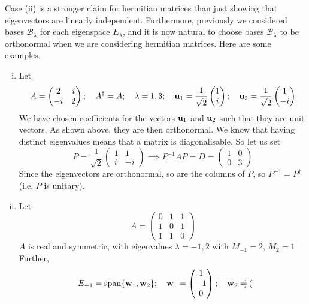 \documentclass{article}
\begin{document}
Case (ii) is a stronger claim for hermitian matrices than just showing that eigenvectors are linearly independent. Furthermore, previously we considered bases $\mathcal B_\lambda$ for each eigenspace $E_\lambda$, and it is now natural to choose bases $\mathcal B_\lambda$ to be orthonormal when we are considering hermitian matrices. Here are some examples.
\begin{enumerate}[(i)]
	\item Let
	      \[ A = \begin{pmatrix}
			      2 & i \\ -i & 2
		      \end{pmatrix};\quad A^\dagger = A;\quad \lambda = 1, 3;\quad\vb u_1 = \frac{1}{\sqrt{2}} \begin{pmatrix}
			      1 \\i
		      \end{pmatrix};\quad\vb u_2 = \frac{1}{\sqrt{2}} \begin{pmatrix}
			      1 \\-i
		      \end{pmatrix} \]
	      We have chosen coefficients for the vectors $\vb u_1$ and $\vb u_2$ such that they are unit vectors. As shown above, they are then orthonormal. We know that having distinct eigenvalues means that a matrix is diagonalisable. So let us set
	      \[ P =  \frac{1}{\sqrt{2}} \begin{pmatrix}
			      1 & 1 \\ i & -i
		      \end{pmatrix} \implies P^{-1}AP = D = \begin{pmatrix}
			      1 & 0 \\ 0 & 3
		      \end{pmatrix} \]
	      Since the eigenvectors are orthonormal, so are the columns of $P$, so $P^{-1} = P^\dagger$ (i.e. $P$ is unitary).
	\item Let
	      \[ A = \begin{pmatrix}
			      0 & 1 & 1 \\ 1 & 0 & 1 \\ 1 & 1 & 0
		      \end{pmatrix} \]
	      $A$ is real and symmetric, with eigenvalues $\lambda = -1, 2$ with $M_{-1} = 2$, $M_2 = 1$. Further,
	      \[ E_{-1} = \operatorname{span} \{ \vb w_1, \vb w_2 \};\quad \vb w_1 = \begin{pmatrix}
			      1 \\ -1 \\ 0
		      \end{pmatrix};\quad \vb w_2 = \begin{pmatrix}

\end{pmatrix}\]
\end{enumerate}
\end{document}
